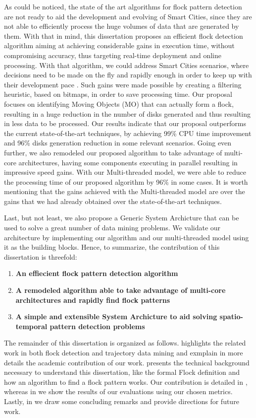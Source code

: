 As could be noticed, the state of the art algorithms for flock pattern detection are not ready to aid the development
and evolving of Smart Cities, since they are not able to efficiently process the huge volumes of data that are generated
by them. With that in mind, this dissertation proposes an efficient flock detection algorithm aiming at achieving
considerable gains in execution time, without compromising accuracy, thus targeting real-time deployment and online
processing. With that algorithm, we could address Smart Cities scenarios, where decisions need to be made on the fly and
rapidly enough in order to keep up with their development pace \citep{ieeesmartcities}\citep{springersmartcities}. Such
gains were made possible by creating a filtering heuristic, based on bitmaps, in order to save processing time. Our
proposal focuses on identifying Moving Objects (MO) that can actually form a flock, resulting in a huge reduction in the
number of disks generated and thus resulting in less data to be processed. Our results indicate that our proposal
outperforms the current state-of-the-art techniques, by achieving 99\% CPU time improvement and 96\% disks generation
reduction in some relevant scenarios. Going even further, we also remodeled our proposed algorithm to take advantage of
multi-core architectures, having some components executing in parallel resulting in impressive speed gains. With our
Multi-threaded model, we were able to reduce the processing time of our proposed algorithm by 96\% in some cases. It is
worth mentioning that the gains achieved with the Multi-threaded model are over the gains that we had already obtained
over the state-of-the-art techniques.

Last, but not least, we also propose a Generic System Archicture that can be used to solve a great number of data mining
problems. We validate our architecture by implementing our algorithm and our multi-threaded model using it as the
building blocks. Hence, to summarize, the contribution of this dissertation is threefold:

\begin{enumerate}
    \item \textbf{An effiecient flock pattern detection algorithm}
    \item \textbf{A remodeled algorithm able to take advantage of multi-core architectures and rapidly find flock
        patterns}
    \item \textbf{A simple and extensible System Archicture to aid solving spatio-temporal pattern detection problems}
\end{enumerate}

The remainder of this dissertation is organized as follows.  highlights the related work in
both flock detection and trajectory data mining and exmplain in more details the academic contribution of our work.
 presents the technical background necessary to understand this dissertation, like the
formal Flock definition and how an algorithm to find a flock pattern works. Our contribution is detailed in
, whereas in  we show the results of our evaluations using our chosen
metrics. Lastly, in  we draw some concluding remarks and provide directions for future work.

